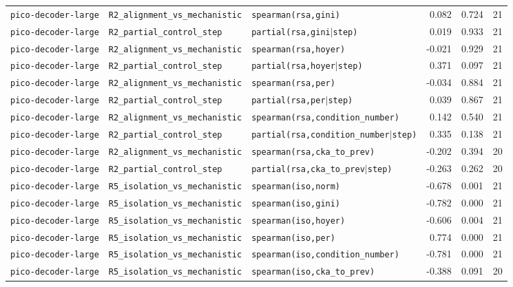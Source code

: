 \begin{longtable}{lllrrr}
\texttt{pico-decoder-large} & \texttt{R2\_alignment\_vs\_mechanistic} & \texttt{spearman(rsa,gini)} & 0.082 & 0.724 & 21 \\
\texttt{pico-decoder-large} & \texttt{R2\_partial\_control\_step} & \texttt{partial(rsa,gini$\mid$step)} & 0.019 & 0.933 & 21 \\
\texttt{pico-decoder-large} & \texttt{R2\_alignment\_vs\_mechanistic} & \texttt{spearman(rsa,hoyer)} & -0.021 & 0.929 & 21 \\
\texttt{pico-decoder-large} & \texttt{R2\_partial\_control\_step} & \texttt{partial(rsa,hoyer$\mid$step)} & 0.371 & 0.097 & 21 \\
\texttt{pico-decoder-large} & \texttt{R2\_alignment\_vs\_mechanistic} & \texttt{spearman(rsa,per)} & -0.034 & 0.884 & 21 \\
\texttt{pico-decoder-large} & \texttt{R2\_partial\_control\_step} & \texttt{partial(rsa,per$\mid$step)} & 0.039 & 0.867 & 21 \\
\texttt{pico-decoder-large} & \texttt{R2\_alignment\_vs\_mechanistic} & \texttt{spearman(rsa,condition\_number)} & 0.142 & 0.540 & 21 \\
\texttt{pico-decoder-large} & \texttt{R2\_partial\_control\_step} & \texttt{partial(rsa,condition\_number$\mid$step)} & 0.335 & 0.138 & 21 \\
\texttt{pico-decoder-large} & \texttt{R2\_alignment\_vs\_mechanistic} & \texttt{spearman(rsa,cka\_to\_prev)} & -0.202 & 0.394 & 20 \\
\texttt{pico-decoder-large} & \texttt{R2\_partial\_control\_step} & \texttt{partial(rsa,cka\_to\_prev$\mid$step)} & -0.263 & 0.262 & 20 \\
\texttt{pico-decoder-large} & \texttt{R5\_isolation\_vs\_mechanistic} & \texttt{spearman(iso,norm)} & -0.678 & 0.001 & 21 \\
\texttt{pico-decoder-large} & \texttt{R5\_isolation\_vs\_mechanistic} & \texttt{spearman(iso,gini)} & -0.782 & 0.000 & 21 \\
\texttt{pico-decoder-large} & \texttt{R5\_isolation\_vs\_mechanistic} & \texttt{spearman(iso,hoyer)} & -0.606 & 0.004 & 21 \\
\texttt{pico-decoder-large} & \texttt{R5\_isolation\_vs\_mechanistic} & \texttt{spearman(iso,per)} & 0.774 & 0.000 & 21 \\
\texttt{pico-decoder-large} & \texttt{R5\_isolation\_vs\_mechanistic} & \texttt{spearman(iso,condition\_number)} & -0.781 & 0.000 & 21 \\
\texttt{pico-decoder-large} & \texttt{R5\_isolation\_vs\_mechanistic} & \texttt{spearman(iso,cka\_to\_prev)} & -0.388 & 0.091 & 20 \\

\end{longtable}
